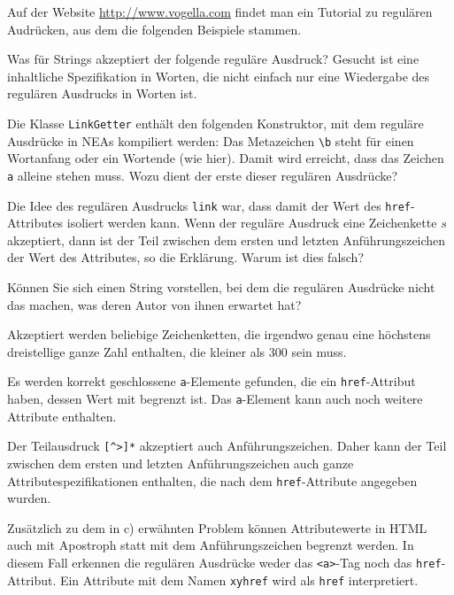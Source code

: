 Auf der Website \url{http://www.vogella.com} findet man ein Tutorial
zu regulären Audrücken, aus dem die folgenden Beispiele stammen.

\begin{teilaufgaben}
\item
Was für Strings akzeptiert der folgende reguläre Ausdruck?
Gesucht ist eine inhaltliche Spezifikation in Worten, die nicht einfach
nur eine Wiedergabe des regulären Ausdrucks in Worten ist.
\item
Die Klasse \texttt{LinkGetter} enthält den folgenden Konstruktor, mit
dem reguläre Ausdrücke in NEAs kompiliert werden:
Das Metazeichen \texttt{\textbackslash b} steht für einen Wortanfang
oder ein Wortende (wie hier).
Damit wird erreicht, dass das Zeichen \texttt{a} alleine stehen muss.
Wozu dient der erste dieser regulären Ausdrücke?
\item
Die Idee des regulären Ausdrucks \texttt{link} war, dass damit der Wert
des \texttt{href}-Attributes isoliert werden kann.
Wenn der reguläre Ausdruck eine Zeichenkette $s$ akzeptiert, dann ist der 
Teil zwischen dem ersten und letzten Anführungszeichen der Wert des
Attributes, so die Erklärung.
Warum ist dies falsch?
\item
Können Sie sich einen String vorstellen, bei dem die regulären Ausdrücke
nicht das machen, was deren Autor von ihnen erwartet hat?
\end{teilaufgaben}


\begin{loesung}
\begin{teilaufgaben}
\item
Akzeptiert werden beliebige Zeichenketten, die irgendwo genau eine höchstens
dreistellige ganze Zahl enthalten, die kleiner als 300 sein muss.
\item
Es werden korrekt geschlossene \texttt{a}-Elemente gefunden, die ein 
\texttt{href}-Attribut haben, dessen Wert mit \texttt{\textquotedbl}
begrenzt ist.
Das \texttt{a}-Element kann auch noch weitere Attribute enthalten.
\item
Der Teilausdruck
\texttt{[\textasciicircum>]*}
akzeptiert auch Anführungszeichen.
Daher kann der Teil zwischen dem ersten und letzten Anführungszeichen
auch ganze Attributespezifikationen enthalten, die nach dem
\texttt{href}-Attribute angegeben wurden.
\item
Zusätzlich zu dem in c) erwähnten Problem können
Attributewerte in HTML auch mit Apostroph \texttt{\textquotesingle}
statt mit dem Anführungszeichen \texttt{\textquotedbl} begrenzt werden.
In diesem Fall erkennen die regulären Ausdrücke weder das \texttt{<a>}-Tag
noch das \texttt{href}-Attribut.
Ein Attribute mit dem Namen \texttt{xyhref} wird als \texttt{href}
interpretiert.
\qedhere
\end{teilaufgaben}
\end{loesung}

